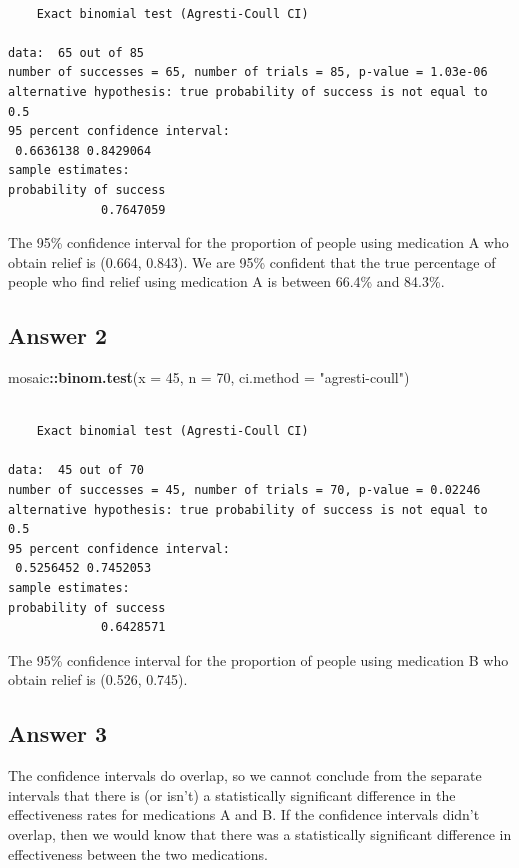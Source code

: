 \documentclass[
]{book}
\newenvironment{Shaded}{\begin{snugshade}}{\end{snugshade}}
\newcommand{\DataTypeTok}[1]{\textcolor[rgb]{0.13,0.29,0.53}{#1}}
\newcommand{\DecValTok}[1]{\textcolor[rgb]{0.00,0.00,0.81}{#1}}
\newcommand{\KeywordTok}[1]{\textcolor[rgb]{0.13,0.29,0.53}{\textbf{#1}}}
\newcommand{\NormalTok}[1]{#1}
\newcommand{\OperatorTok}[1]{\textcolor[rgb]{0.81,0.36,0.00}{\textbf{#1}}}
\newcommand{\StringTok}[1]{\textcolor[rgb]{0.31,0.60,0.02}{#1}}
\begin{document}
\begin{verbatim}

	Exact binomial test (Agresti-Coull CI)

data:  65 out of 85
number of successes = 65, number of trials = 85, p-value = 1.03e-06
alternative hypothesis: true probability of success is not equal to 0.5
95 percent confidence interval:
 0.6636138 0.8429064
sample estimates:
probability of success 
             0.7647059 
\end{verbatim}

The 95\% confidence interval for the proportion of people using medication A who obtain relief is (0.664, 0.843). We are 95\% confident that the true percentage of people who find relief using medication A is between 66.4\% and 84.3\%.

\hypertarget{answer-2}{%
\subsection{Answer 2}\label{answer-2}}

\begin{Shaded}
\begin{Highlighting}[]
\NormalTok{mosaic}\OperatorTok{::}\KeywordTok{binom.test}\NormalTok{(}\DataTypeTok{x =} \DecValTok{45}\NormalTok{, }\DataTypeTok{n =} \DecValTok{70}\NormalTok{, }\DataTypeTok{ci.method =} \StringTok{"agresti-coull"}\NormalTok{)}
\end{Highlighting}
\end{Shaded}

\begin{verbatim}

	Exact binomial test (Agresti-Coull CI)

data:  45 out of 70
number of successes = 45, number of trials = 70, p-value = 0.02246
alternative hypothesis: true probability of success is not equal to 0.5
95 percent confidence interval:
 0.5256452 0.7452053
sample estimates:
probability of success 
             0.6428571 
\end{verbatim}

The 95\% confidence interval for the proportion of people using medication B who obtain relief is (0.526, 0.745).

\hypertarget{answer-3}{%
\subsection{Answer 3}\label{answer-3}}

The confidence intervals do overlap, so we cannot conclude from the separate intervals that there is (or isn't) a statistically significant difference in the effectiveness rates for medications A and B. If the confidence intervals didn't overlap, then we would know that there was a statistically significant difference in effectiveness between the two medications.
\end{document}
